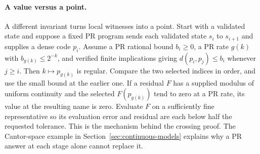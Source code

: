 \paragraph{A value versus a point.}
A different invariant turns local witnesses into a point. Start with a validated state and suppose a fixed PR program sends each validated state \(s_i\) to \(s_{i+1}\) and supplies a dense code \(p_i\). Assume a PR rational bound \(b_i\ge0\), a PR rate \(g(k)\) with \(b_{g(k)}\le2^{-k}\), and verified finite implications giving \(d(p_i,p_j)\le b_i\) whenever \(j\ge i\). Then \(k\mapsto p_{g(k)}\) is regular. Compare the two selected indices in order, and use the small bound at the earlier one. If a residual \(F\) has a supplied modulus of uniform continuity and the selected \(F(p_{g(k)})\) tend to zero at a PR rate, its value at the resulting name is zero. Evaluate \(F\) on a sufficiently fine representative so its evaluation error and residual are each below half the requested tolerance. This is the mechanism behind the crossing proof. The Cantor-space example in Section~\ref{sec:continuous-models} explains why a PR answer at each stage alone cannot replace it.

